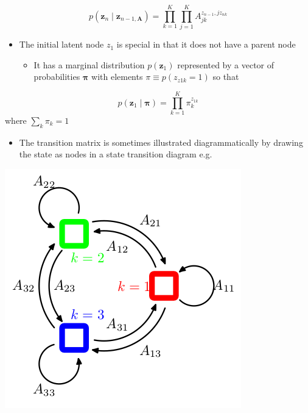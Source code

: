 \documentclass[11pt]{article}
\begin{document}
\begin{equation}
  p(\pmb z_n \mid \pmb z_{n-1, \pmb A}) = \prod_{k=1}^K \prod_{j=1}^K A_{jk}^{z_{n-1},jz_{nk}}
\end{equation}
\begin{itemize}
\item The initial latent node \(z_1\) is special in that it does not have a parent node
\begin{itemize}
\item It has a marginal distribution \(p(\pmb z_1)\) represented by a vector of probabilities \(\pmb \pi\) with elements \(\pi \equiv p(z_{z1k}=1)\) so that
\end{itemize}
\end{itemize}
\begin{equation}
  p(\pmb z_1 \mid \pmb \pi) = \prod_{k=1}^K \pi_k^{z_{1k}}
\end{equation}
where \(\sum_k \pi_k = 1\) 

\begin{itemize}
\item The transition matrix is sometimes illustrated diagrammatically by drawing the state as nodes in a state transition diagram e.g.
\end{itemize}
\begin{center}
\includegraphics[width=.9\linewidth]{Sequential Data/screenshot_2018-10-29_16-41-00.png}
\end{center}
\end{document}
